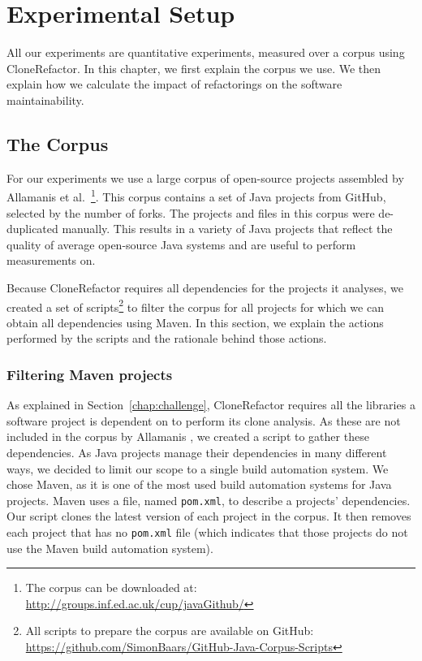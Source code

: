 \chapter{Experimental Setup}\label{ch:experimentalsetup}
All our experiments are quantitative experiments, measured over a corpus using CloneRefactor. In this chapter, we first explain the corpus we use. We then explain how we calculate the impact of refactorings on the software maintainability.

\section{The Corpus}\label{chap:corpus}
For our experiments we use a large corpus of open-source projects assembled by Allamanis et al.~\cite{githubCorpus2013}\footnote{The corpus can be downloaded at: \url{http://groups.inf.ed.ac.uk/cup/javaGithub/}}. This corpus contains a set of Java projects from GitHub, selected by the number of forks. The projects and files in this corpus were de-duplicated manually. This results in a variety of Java projects that reflect the quality of average open-source Java systems and are useful to perform measurements on.

Because CloneRefactor requires all dependencies for the projects it analyses, we created a set of scripts\footnote{All scripts to prepare the corpus are available on GitHub: \url{https://github.com/SimonBaars/GitHub-Java-Corpus-Scripts}} to filter the corpus for all projects for which we can obtain all dependencies using Maven. In this section, we explain the actions performed by the scripts and the rationale behind those actions.

\subsection{Filtering Maven projects}
As explained in Section~\ref{chap:challenge}, CloneRefactor requires all the libraries a software project is dependent on to perform its clone analysis. As these are not included in the corpus by Allamanis \cite{githubCorpus2013}, we created a script to gather these dependencies. As Java projects manage their dependencies in many different ways, we decided to limit our scope to a single build automation system. We chose Maven, as it is one of the most used build automation systems for Java projects. Maven uses a file, named \texttt{pom.xml}, to describe a projects' dependencies. Our script clones the latest version of each project in the corpus. It then removes each project that has no \texttt{pom.xml} file (which indicates that those projects do not use the Maven build automation system).

